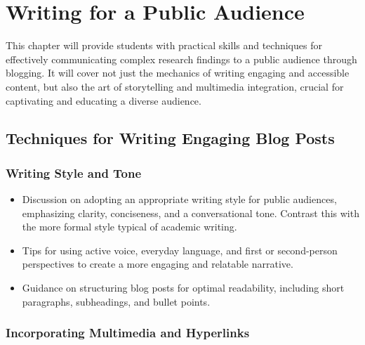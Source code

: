 \documentclass[
]{book}
\begin{document}
\hypertarget{writing-for-a-public-audience}{%
\chapter*{Writing for a Public Audience}\label{writing-for-a-public-audience}}

This chapter will provide students with practical skills and techniques for effectively communicating complex research findings to a public audience through blogging. It will cover not just the mechanics of writing engaging and accessible content, but also the art of storytelling and multimedia integration, crucial for captivating and educating a diverse audience.

\hypertarget{techniques-for-writing-engaging-blog-posts}{%
\section*{Techniques for Writing Engaging Blog Posts}\label{techniques-for-writing-engaging-blog-posts}}

\hypertarget{writing-style-and-tone}{%
\subsection*{Writing Style and Tone}\label{writing-style-and-tone}}

\begin{itemize}
\item
  Discussion on adopting an appropriate writing style for public audiences, emphasizing clarity, conciseness, and a conversational tone. Contrast this with the more formal style typical of academic writing.
\item
  Tips for using active voice, everyday language, and first or second-person perspectives to create a more engaging and relatable narrative.
\item
  Guidance on structuring blog posts for optimal readability, including short paragraphs, subheadings, and bullet points.
\end{itemize}

\hypertarget{incorporating-multimedia-and-hyperlinks}{%
\subsection*{Incorporating Multimedia and Hyperlinks}\label{incorporating-multimedia-and-hyperlinks}}
\end{document}
